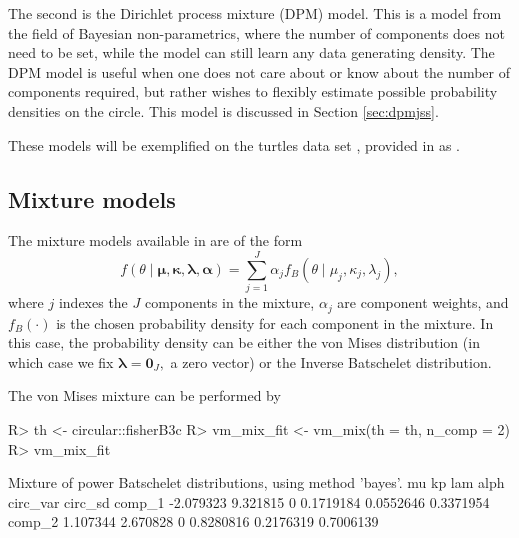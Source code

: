 The second is the Dirichlet process mixture (DPM) model. This is a model
from the field of Bayesian non-parametrics, where the number of
components does not need to be set, while the model can still learn any
data generating density. The DPM model is useful when one does not care
about or know about the number of components required, but rather wishes
to flexibly estimate possible probability densities on the circle. This
model is discussed in Section \ref{sec:dpmjss}.

These models will be exemplified on the turtles data set
\citep{stephens1969techniques, fisher1995statistical}, provided in
 as .

\hypertarget{mixture-models}{%
\subsection{Mixture models}\label{mixture-models}}

\label{mixmod}

The mixture models available in  are of the form
\begin{equation}
 f(\theta \mid \boldsymbol{\mu}, \boldsymbol{\kappa}, \boldsymbol{\lambda}, \boldsymbol{\alpha}) = \sum_{j = 1}^J\alpha_j f_B(\theta \mid \mu_j, \kappa_j, \lambda_j),
\end{equation} where \(j\) indexes the \(J\) components in the mixture,
\(\alpha_j\) are component weights, and \(f_B(\cdot)\) is the chosen
probability density for each component in the mixture. In this case, the
probability density can be either the von Mises distribution (in which
case we fix \(\boldsymbol{\lambda}= \boldsymbol{0}_J,\) a zero vector)
or the Inverse Batschelet distribution.

The von Mises mixture can be performed by

\begin{CodeChunk}

\begin{CodeInput}
R> th <- circular::fisherB3c
R> vm_mix_fit <- vm_mix(th = th, n_comp = 2)
R> vm_mix_fit
\end{CodeInput}

\begin{CodeOutput}
Mixture of power Batschelet distributions, using method 'bayes'.
              mu       kp lam      alph  circ_var   circ_sd
comp_1 -2.079323 9.321815   0 0.1719184 0.0552646 0.3371954
comp_2  1.107344 2.670828   0 0.8280816 0.2176319 0.7006139
\end{CodeOutput}
\end{CodeChunk}

